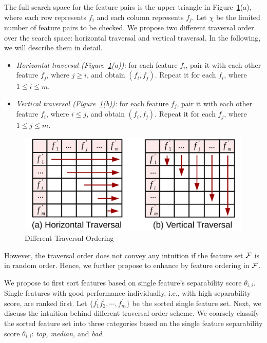 The full search space for the feature pairs is the upper triangle in Figure~\ref{fig:traversal}(a), where each row represents $f_i$ and each column represents $f_j$. Let $\chi$ be the limited number of feature pairs to be checked. We propose two different traversal order over the search space: horizontal traversal and vertical traversal. In the following, we will describe them in detail.
\begin{itemize}
\item \emph{Horizontal traversal (Figure~\ref{fig:traversal}(a)):} for each feature $f_i$, pair it with each other feature $f_j$, where $j\geq i$, and obtain $(f_i,f_j)$. Repeat it for each $f_i$, where $1 \leq i\leq m$.
\item \emph{Vertical traversal (Figure~\ref{fig:traversal}(b)):} for each feature $f_j$, pair it with each other feature $f_i$, where $i\leq j$, and obtain $(f_i,f_j)$. Repeat it for each $f_j$, where $1 \leq j\leq m$.
\end{itemize}

\begin{figure}[h]
  \centering
  \vspace{-5mm}
  \includegraphics[width=0.85\linewidth]{fig/traversal.pdf}
  \vspace{-5mm}
\caption{Different Traversal Ordering}
\vspace{-5mm}
\label{fig:traversal}
\end{figure} 

However, the traversal order does not convey any intuition if the feature set $\ff$ is in random order. Hence, we further propose to enhance \traversal by feature ordering in $\ff$.

 We propose to first sort features based on single feature's separability score $\theta_{i,i}$. Single features with good performance individually, i.e., with high separability score, are ranked first. Let $\{f_1^{'} f_2^{'},\cdots,f_m^{'}\}$ be the sorted single feature set. Next, we discuss the intuition behind different traversal order scheme. We coarsely classify the sorted feature set into three categories based on the single feature separability score $\theta_{i,i}$: {\em top, median,} and {\em bad}. 

